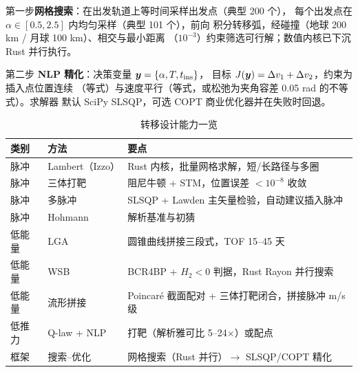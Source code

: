 第一步\textbf{网格搜索}：在出发轨道上等时间采样出发点（典型 200 个），
每个出发点在 $\alpha \in [0.5, 2.5]$ 内均匀采样（典型 101 个），前向
积分转移弧，经碰撞（地球 200 km / 月球 100 km）、相交与最小距离
（$10^{-3}$）约束筛选可行解；数值内核已下沉 Rust 并行执行。

第二步 \textbf{NLP 精化}：决策变量 $\bm{y} = \{\alpha, T, t_{\mathrm{ins}}\}$，
目标 $J(\bm{y}) = \Delta v_1 + \Delta v_2$，约束为插入点位置连续
（等式）与速度平行（等式，或松弛为夹角容差 0.05 rad 的不等式）。求解器
默认 SciPy SLSQP，可选 COPT 商业优化器并在失败时回退。

\begin{table}[htbp]
\centering\small
\caption{转移设计能力一览}
\label{tab:transfer}
\begin{tabularx}{\textwidth}{@{}llX@{}}
\toprule
\textbf{类别} & \textbf{方法} & \textbf{要点} \\
\midrule
脉冲 & Lambert（Izzo） & Rust 内核，批量网格求解，短/长路径与多圈 \\
脉冲 & 三体打靶 & 阻尼牛顿 + STM，位置误差 $< 10^{-8}$ 收敛 \\
脉冲 & 多脉冲 & SLSQP + Lawden 主矢量检验，自动建议插入脉冲 \\
脉冲 & Hohmann & 解析基准与初猜 \\
低能量 & LGA & 圆锥曲线拼接三段式，TOF 15--45 天 \\
低能量 & WSB & BCR4BP + $H_2<0$ 判据，Rust Rayon 并行搜索 \\
低能量 & 流形拼接 & Poincaré 截面配对 + 三体打靶闭合，拼接脉冲 m/s 级 \\
低推力 & Q-law + NLP & 打靶（解析雅可比 5--24$\times$）或配点 \\
框架 & 搜索--优化 & 网格搜索（Rust 并行）$\to$ SLSQP/COPT 精化 \\
\bottomrule
\end{tabularx}
\end{table}
